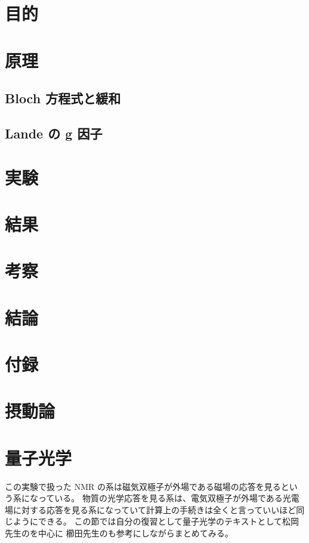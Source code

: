 \documentclass[11pt,dvipdfmx,a4paper]{jsarticle}
\begin{document}
\section{目的}

\section{原理}
\subsection{Bloch 方程式と緩和}

\subsection{Lande の g 因子}

\section{実験}

\section{結果}

\section{考察}

\section{結論}





\section*{付録}
\section{摂動論}%

\section{量子光学}
この実験で扱った NMR の系は磁気双極子が外場である磁場の応答を見るという系になっている。
物質の光学応答を見る系は、電気双極子が外場である光電場に対する応答を見る系になっていて計算上の手続きは全くと言っていいほど同じようにできる。
この節では自分の復習として量子光学のテキストとして松岡先生\cite{Matsuoka_2000}のを中心に
櫛田先生\cite{Kushida_1991}のも参考にしながらまとめてみる。
\end{document}
